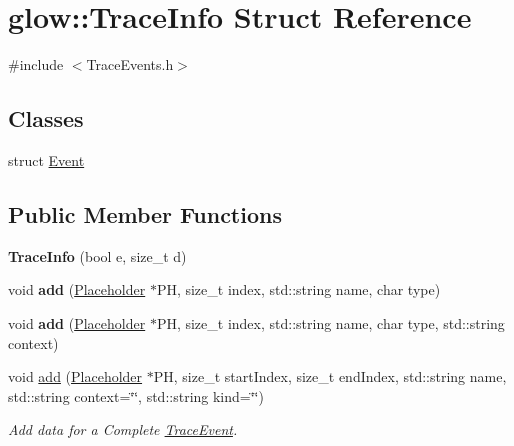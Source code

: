 \hypertarget{structglow_1_1_trace_info}{}\section{glow\+:\+:Trace\+Info Struct Reference}
\label{structglow_1_1_trace_info}


{\ttfamily \#include $<$Trace\+Events.\+h$>$}

\subsection*{Classes}
\begin{DoxyCompactItemize}
\item 
struct \hyperlink{structglow_1_1_trace_info_1_1_event}{Event}
\end{DoxyCompactItemize}
\subsection*{Public Member Functions}
\begin{DoxyCompactItemize}
\item 
\mbox{\label{structglow_1_1_trace_info_a5a6c4a9eea7d41c94d1025c7469089d4}} 
{\bfseries Trace\+Info} (bool e, size\+\_\+t d)
\item 
\mbox{\label{structglow_1_1_trace_info_ac71e586c7b886deb5ade61584aff0577}} 
void {\bfseries add} (\hyperlink{classglow_1_1_placeholder}{Placeholder} $\ast$PH, size\+\_\+t index, std\+::string name, char type)
\item 
\mbox{\label{structglow_1_1_trace_info_a5665d43abc8ef77741d01a08fef4dc31}} 
void {\bfseries add} (\hyperlink{classglow_1_1_placeholder}{Placeholder} $\ast$PH, size\+\_\+t index, std\+::string name, char type, std\+::string context)
\item 
\mbox{\label{structglow_1_1_trace_info_a2d8f54a12a9eef00530d1ead453a8387}} 
void \hyperlink{structglow_1_1_trace_info_a2d8f54a12a9eef00530d1ead453a8387}{add} (\hyperlink{classglow_1_1_placeholder}{Placeholder} $\ast$PH, size\+\_\+t start\+Index, size\+\_\+t end\+Index, std\+::string name, std\+::string context=\char`\"{}\char`\"{}, std\+::string kind=\char`\"{}\char`\"{})
\begin{DoxyCompactList}\small\item\em Add data for a Complete \hyperlink{structglow_1_1_trace_event}{Trace\+Event}. \end{DoxyCompactList}\end{DoxyCompactItemize}
